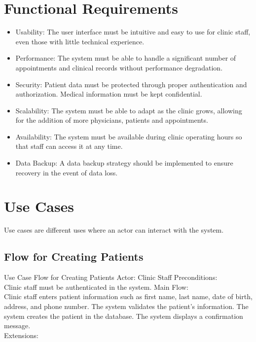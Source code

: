\documentclass{scrreprt}
\begin{document}
	\section{Functional Requirements}
	
	\begin{itemize}
		\item Usability:
		The user interface must be intuitive and easy to use for clinic staff, even those with little technical experience.
		\item Performance:
		The system must be able to handle a significant number of appointments and clinical records without performance degradation.
		\item Security:
		Patient data must be protected through proper authentication and authorization. Medical information must be kept confidential.
		\item Scalability:
		The system must be able to adapt as the clinic grows, allowing for the addition of more physicians, patients and appointments.
		\item Availability:
		The system must be available during clinic operating hours so that staff can access it at any time.
		\item Data Backup:
		A data backup strategy should be implemented to ensure recovery in the event of data loss.
		
	\end{itemize}
	\section{Use Cases}
	Use cases are different uses where an actor can interact with the system.
	\pagebreak
	\subsection{Flow for Creating Patients}
	Use Case Flow for Creating Patients
	Actor: Clinic Staff
	Preconditions:\\
	
	Clinic staff must be authenticated in the system.
	Main Flow:\\
	
	Clinic staff enters patient information such as first name, last name, date of birth, address, and phone number.
	The system validates the patient's information.
	The system creates the patient in the database.
	The system displays a confirmation message.\\
	
	Extensions:\\
	
\end{document}
